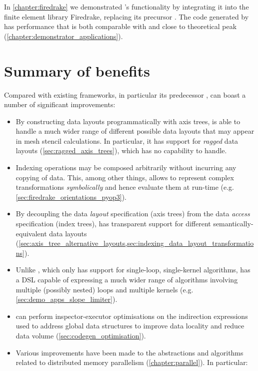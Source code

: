 \documentclass[thesis]{subfiles}
\begin{document}
In \cref{chapter:firedrake} we demonstrated 's functionality by integrating it into the finite element library Firedrake, replacing its precursor .
The code generated by  has performance that is both comparable with  and close to theoretical peak (\cref{chapter:demonstrator_applications}).

\section{Summary of benefits}

Compared with existing frameworks, in particular its predecessor ,  can boast a number of significant improvements:
\begin{itemize}
  \item
    By constructing data layouts programmatically with axis trees,  is able to handle a much wider range of different possible data layouts that may appear in mesh stencil calculations.
    In particular, it has support for \emph{ragged} data layouts (\cref{sec:ragged_axis_trees}), which  has no capability to handle.
  \item
    Indexing operations may be composed arbitrarily without incurring any copying of data.
    This, among other things, allows  to represent complex transformations \emph{symbolically} and hence evaluate them at run-time (e.g. \cref{sec:firedrake_orientations_pyop3}).
  \item
    By decoupling the data \emph{layout} specification (axis trees) from the data \emph{access} specification (index trees),  has transparent support for different semantically-equivalent data layouts (\cref{sec:axis_tree_alternative_layouts,sec:indexing_data_layout_transformations}).
  \item
    Unlike , which only has support for single-loop, single-kernel algorithms,  has a DSL capable of expressing a much wider range of algorithms involving multiple (possibly nested) loops and multiple kernels (e.g. \cref{sec:demo_apps_slope_limiter}).
  \item
     can perform inspector-executor optimisations on the indirection expressions used to address global data structures to improve data locality and reduce data volume (\cref{sec:codegen_optimisation}).
  \item
    Various improvements have been made to the abstractions and algorithms related to distributed memory parallelism (\cref{chapter:parallel}).
    In particular:
    \begin{itemize}

\end{itemize}
\end{itemize}
\end{document}
